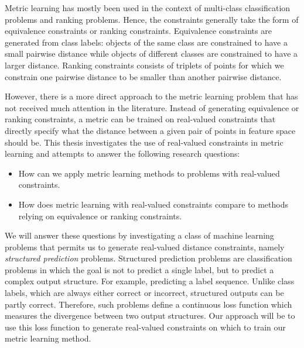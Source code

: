 Metric learning has mostly been used in the context of multi-class classification problems and ranking problems. Hence, the constraints generally take the form of equivalence constraints or ranking constraints. Equivalence constraints are generated from class labels: objects of the same class are constrained to have a small pairwise distance while objects of different classes are constrained to have a larger distance. Ranking constraints consists of triplets of points for which we constrain one pairwise distance to be smaller than another pairwise distance.

However, there is a more direct approach to the metric learning problem that has not received much attention in the literature. Instead of generating equivalence or ranking constraints, a metric can be trained on real-valued constraints that directly specify what the distance between a given pair of points in feature space should be. This thesis investigates the use of real-valued constraints in metric learning and attempts to answer the following research questions:
\begin{itemize}
\item How can we apply metric learning methods to problems with real-valued constraints.
\item How does metric learning with real-valued constraints compare to methods relying on equivalence or ranking constraints.
\end{itemize}

We will answer these questions by investigating a class of machine learning problems that permits us to generate real-valued distance constraints, namely \emph{structured prediction} problems. Structured prediction problems are classification problems in which the goal is not to predict a single label, but to predict a complex output structure. For example, predicting a label sequence. Unlike class labels, which are always either correct or incorrect, structured outputs can be partly correct. Therefore, such problems define a continuous loss function which measures the divergence between two output structures. Our approach will be to use this loss function to generate real-valued constraints on which to train our metric learning method.

